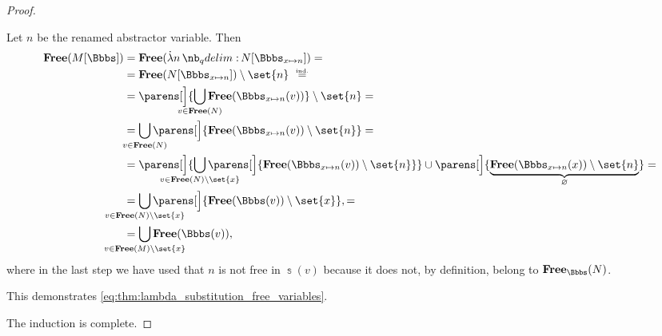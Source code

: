 \begin{proof}
\begin{itemize}
\begin{itemize}
      Let \( n \) be the renamed abstractor variable. Then
      \begin{align*}
        \op*{Free}(M[\Bbbs])
        &=
        \op*{Free}(\qabs n N[\Bbbs_{x \mapsto n}])
        = \\ &=
        \op*{Free}(N[\Bbbs_{x \mapsto n}]) \setminus \set{ n }
        \reloset {\T{ind.}} = \\ &=
        \parens[\Big]{ \bigcup_{\mathclap{v \in \op*{Free}(N)}} \op*{Free}(\Bbbs_{x \mapsto n}(v)) } \setminus \set{ n }
        = \\ &=
        \bigcup_{\mathclap{v \in \op*{Free}(N)}} \parens[\Big]{ \op*{Free}(\Bbbs_{x \mapsto n}(v)) \setminus \set{ n } }
        = \\ &=
        \parens[\Big]{ \bigcup_{\mathclap{v \in \op*{Free}(N) \setminus \set{ x }}} \parens[\Big]{ \op*{Free}(\Bbbs_{x \mapsto n}(v)) \setminus \set{ n } } } \cup \parens[\Big]{ \underbrace{\op*{Free}(\Bbbs_{x \mapsto n}(x)) \setminus \set{ n }}_\varnothing }
        = \\ &=
        \bigcup_{\mathclap{v \in \op*{Free}(N) \setminus \set{ x }}} \parens[\Big]{ \op*{Free}(\Bbbs(v)) \setminus \set{ x } },
        = \\ &=
        \bigcup_{\mathclap{v \in \op*{Free}(M) \setminus \set{ x }}} \op*{Free}(\Bbbs(v)),
      \end{align*}
      where in the last step we have used that \( n \) is not free in \( \Bbbs(v) \) because it does not, by definition, belong to \( \op*{Free}_\Bbbs(N) \).

      This demonstrates \eqref{eq:thm:lambda_substitution_free_variables}.
    \end{itemize}
  \end{itemize}

  The induction is complete.
\end{proof}


